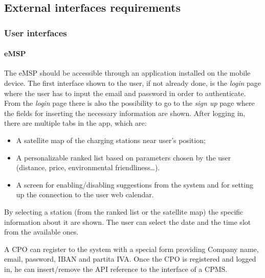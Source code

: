 \subsection{External interfaces requirements}

\subsubsection{User interfaces}
\paragraph{\ac{eMSP}}
The \ac{eMSP} should be accessible through an application installed on the mobile device.
The first interface shown to the user, if not already done, is the \textit{login} page where the user has to input the email and password in order to authenticate.
From the \textit{login} page there is also the possibility to go to the \textit{sign up} page where the fields for inserting the necessary information are shown.
After logging in, there are multiple tabs in the app, which are:
\begin{itemize}
    \item A satellite map of the charging stations near user's position;
    \item A personalizable ranked list based on parameters chosen by the user (distance, price, environmental friendliness\ldots).
    \item A screen for enabling/disabling suggestions from the system and for setting up the connection to the user web calendar.
\end{itemize}
By selecting a station (from the ranked list or the satellite map) the specific information about it are shown. The user can select the date and the time slot from the available ones.

A \ac{CPO} can register to the system with a special form providing Company name, email, password, \ac{IBAN} and \gls{partita IVA}. Once the \ac{CPO} is registered and logged in, he can insert/remove the \ac{API} reference to the interface of a \ac{CPMS}.

